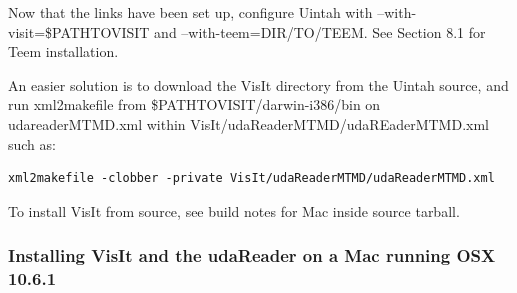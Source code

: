 \documentclass[12pt]{article}
\begin{document}
Now that the links have been set up, configure Uintah with
--with-visit=\$PATHTOVISIT and --with-teem=DIR/TO/TEEM.  See Section
8.1 for Teem installation.

An easier solution is to download the VisIt directory from the Uintah
source, and run xml2makefile from \$PATHTOVISIT/darwin-i386/bin on
udareaderMTMD.xml within VisIt/udaReaderMTMD/udaREaderMTMD.xml such
as:

\begin{verbatim}
xml2makefile -clobber -private VisIt/udaReaderMTMD/udaReaderMTMD.xml
\end{verbatim}

To install VisIt from source, see build notes for Mac inside source
tarball.

\subsubsection{Installing VisIt and the udaReader on a Mac running OSX 10.6.1}
\end{document}
